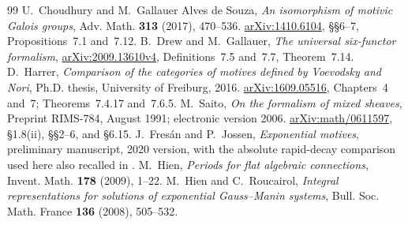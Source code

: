 \documentclass[11pt]{article}
\numberwithin{equation}{section}
\theoremstyle{definition}
\theoremstyle{remark}
\begin{document}
\begin{thebibliography}{99}
U.~Choudhury and M.~Gallauer Alves de Souza,
\emph{An isomorphism of motivic Galois groups},
Adv. Math. \textbf{313} (2017), 470--536.
\href{https://arxiv.org/abs/1410.6104}{arXiv:1410.6104},
\S\S6--7, Propositions~7.1 and~7.12.
B.~Drew and M.~Gallauer,
\emph{The universal six-functor formalism},
\href{https://arxiv.org/abs/2009.13610v4}{arXiv:2009.13610v4},
Definitions~7.5 and~7.7, Theorem~7.14.
D.~Harrer,
\emph{Comparison of the categories of motives defined by Voevodsky and Nori},
Ph.D. thesis, University of Freiburg, 2016.
\href{https://arxiv.org/abs/1609.05516}{arXiv:1609.05516},
Chapters~4 and~7; Theorems~7.4.17 and~7.6.5.
M.~Saito, \emph{On the formalism of mixed sheaves},
Preprint RIMS-784, August 1991; electronic version 2006.
\href{https://arxiv.org/abs/math/0611597}{arXiv:math/0611597},
\S1.8(ii), \S\S2--6, and \S6.15.
J.~Fres\'an and P.~Jossen, \emph{Exponential motives},
preliminary manuscript, 2020 version, with the absolute rapid-decay
comparison used here also recalled in \cite[\S3]{Snodgrass}.
M.~Hien, \emph{Periods for flat algebraic connections},
Invent. Math. \textbf{178} (2009), 1--22.
M.~Hien and C.~Roucairol,
\emph{Integral representations for solutions of exponential Gauss--Manin systems},
Bull. Soc. Math. France \textbf{136} (2008), 505--532.

\end{thebibliography}
\end{document}
